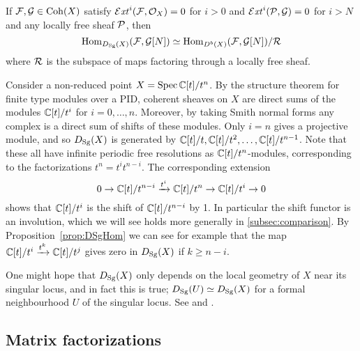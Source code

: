 \begin{proposition}[label=prop:DSgHom]{\cite[Prop 1.21]{OrlovSingularities}}{}
    If $\mathcal{F},\mathcal{G}\in\operatorname{Coh}(X)$ satisfy
    $\operatorname{\mathcal{E}\mathit{xt}}^i(\mathcal{F},\mathcal{O}_X)=0$ for $i>0$ and $\operatorname{\mathcal{E}\mathit{xt}}^i(\mathcal{P},\mathcal{G})=0$ for $i>N$ and
    any locally free sheaf $\mathcal{P}$, then
    \begin{equation*}
        \operatorname{Hom}_{D_{\mathrm{Sg}}(X)}(\mathcal{F},\mathcal{G}[N])
            \simeq \operatorname{Hom}_{D^b(X)}(\mathcal{F},\mathcal{G}[N])/\mathcal{R}
    \end{equation*}
    where $\mathcal{R}$ is the subspace of maps factoring through a locally free
    sheaf.
\end{proposition}

\begin{example}{}{}
    Consider a non-reduced point $X=\operatorname{Spec}\mathbb{C}[t]/t^n$. By the structure theorem
    for finite type modules over a PID, coherent sheaves on $X$ are direct sums
    of the modules $\mathbb{C}[t]/t^i$ for $i=0,\ldots,n$. Moreover, by taking Smith
    normal forms any complex is a direct sum of shifts of these modules. Only
    $i=n$ gives a projective module, and so $D_{\mathrm{Sg}}(X)$ is generated by
    $\mathbb{C}[t]/t,\mathbb{C}[t]/t^2,\ldots,\mathbb{C}[t]/t^{n-1}$. Note that these all have infinite
    periodic free resolutions as $\mathbb{C}[t]/t^n$-modules, corresponding to the
    factorizations $t^n=t^it^{n-i}$. The corresponding extension
    \begin{equation*}
        0 \to \mathbb{C}[t]/t^{n-i} \xrightarrow{t^i} \mathbb{C}[t]/t^n \to \mathbb{C}[t]/t^i \to 0
    \end{equation*}
    shows that $\mathbb{C}[t]/t^i$ is the shift of $\mathbb{C}[t]/t^{n-i}$ by 1. In particular
    the shift functor is an involution, which we will see holds more generally
    in \ref{subsec:comparison}. By Proposition~\ref{prop:DSgHom} we can see for
    example that the map $\mathbb{C}[t]/t^i\xrightarrow{t^k}\mathbb{C}[t]/t^j$ gives zero in
    $D_{\mathrm{Sg}}(X)$ if $k\ge n-i$.
\end{example}

One might hope that $D_{\mathrm{Sg}}(X)$ only depends on the local geometry of $X$ near
its singular locus, and in fact this is true; $D_{\mathrm{Sg}}(U)\simeq D_{\mathrm{Sg}}(X)$ for a
formal neighbourhood $U$ of the singular locus. See
\cite[Prop~1.14]{OrlovSingularities} and \cite[\S6]{Shipman}.

\subsection{Matrix factorizations}

